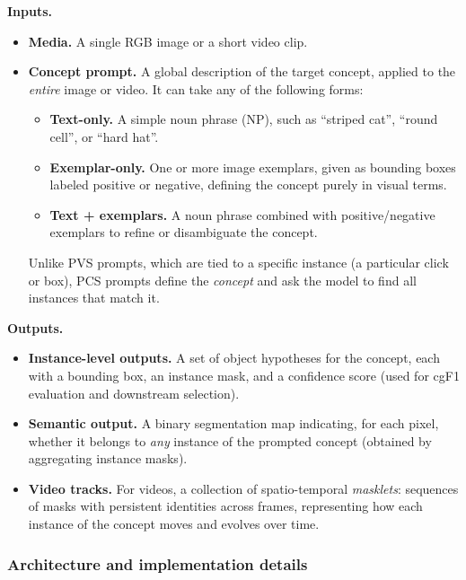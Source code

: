 \begin{enrichment}
\begin{enrichment}
		\textbf{Inputs.}
		\begin{itemize}
			\item \textbf{Media.} A single RGB image or a short video clip.
			\item \textbf{Concept prompt.} A global description of the target concept, applied to the \emph{entire} image or video. It can take any of the following forms:
			\begin{itemize}
				\item \textbf{Text-only.} A simple noun phrase (NP), such as ``striped cat'', ``round cell'', or ``hard hat''.
				\item \textbf{Exemplar-only.} One or more image exemplars, given as bounding boxes labeled positive or negative, defining the concept purely in visual terms.
				\item \textbf{Text + exemplars.} A noun phrase combined with positive/negative exemplars to refine or disambiguate the concept.
			\end{itemize}
			Unlike PVS prompts, which are tied to a specific instance (a particular click or box), PCS prompts define the \emph{concept} and ask the model to find all instances that match it.
		\end{itemize}
		
		\textbf{Outputs.}
		\begin{itemize}
			\item \textbf{Instance-level outputs.} A set of object hypotheses for the concept, each with a bounding box, an instance mask, and a confidence score (used for cgF1 evaluation and downstream selection).
			\item \textbf{Semantic output.} A binary segmentation map indicating, for each pixel, whether it belongs to \emph{any} instance of the prompted concept (obtained by aggregating instance masks).
			\item \textbf{Video tracks.} For videos, a collection of spatio-temporal \emph{masklets}: sequences of masks with persistent identities across frames, representing how each instance of the concept moves and evolves over time.
		\end{itemize}
		
		\newpage
		
		\subsubsection{Architecture and implementation details}
		\label{subsubsec:chapter15_sam3_architecture}
		

\end{enrichment}
\end{enrichment}
